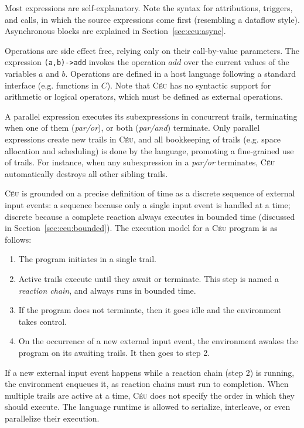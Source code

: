 \documentclass{sig-alternate-ipsn09}
\newcommand{\2}{\;\;}
\newcommand{\5}{\;\;\;\;\;}
\newcommand{\CEU}{\textsc{C\'{e}u}}
\begin{document}
Most expressions are self-explanatory.
Note the syntax for attributions, triggers, and calls, in which the source 
expressions come first (resembling a dataflow style).
Asynchronous blocks are explained in Section~\ref{sec:ceu:async}.

Operations are side effect free, relying only on their call-by-value 
parameters.
The expression \texttt{(a,b)->add} invokes the operation $add$ over the current 
values of the variables $a$ and $b$.
Operations are defined in a host language following a standard interface (e.g.  
functions in $C$).
Note that \CEU{} has no syntactic support for arithmetic or logical operators, 
which must be defined as external operations.

A parallel expression executes its subexpressions in concurrent trails, 
terminating when one of them (\emph{par/or}), or both (\emph{par/and}) 
terminate.
Only parallel expressions create new trails in \CEU{}, and all bookkeeping of 
trails (e.g. space allocation and scheduling) is done by the language, 
promoting a fine-grained use of trails.
For instance, when any subexpression in a \emph{par/or} terminates, \CEU{} 
automatically destroys all other sibling trails.

\CEU{} is grounded on a precise definition of time as a discrete sequence of 
external input events: a sequence because only a single input event is handled 
at a time; discrete because a complete reaction always executes in bounded time 
(discussed in Section~\ref{sec:ceu:bounded}).
The execution model for a \CEU{} program is as follows:

\begin{enumerate}
\setlength{\itemsep}{0pt}
\item The program initiates in a single trail.
\item Active trails execute until they await or terminate.
      This step is named a \emph{reaction chain}, and always runs in bounded 
      time.
\item If the program does not terminate, then it goes idle and the environment 
      takes control.
\item On the occurrence of a new external input event, the environment awakes 
      the program on its awaiting trails.
      It then goes to step 2.
\end{enumerate}

If a new external input event happens while a reaction chain (step 2) is 
running, the environment enqueues it, as reaction chains must run to 
completion.
When multiple trails are active at a time, \CEU{} does not specify the order in 
which they should execute.
The language runtime is allowed to serialize, interleave, or even parallelize 
their execution.
\end{document}

